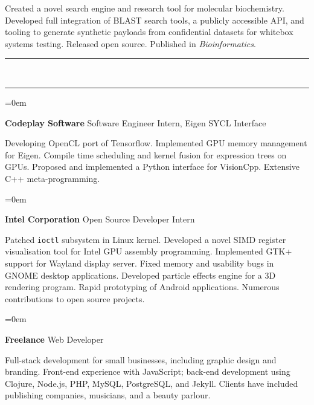 \documentclass[a4paper,11pt,hidelinks]{scrartcl}
\newcommand{\MarginText}[1]{\marginpar{\raggedleft\itshape\normalsize#1}}
\newcommand{\Title}[1]{\noindent\rule{15cm}{0.4pt}\vspace{-.45em}\\
\noindent\spacedlowsmallcaps{\color{titlecolour}{#1}}

\vspace{-.85em}\noindent\rule{15cm}{0.4pt}\vspace{.2em}}
\newcommand{\Description}[1]{\hangindent=0em\hangafter=0%
\noindent\normalsize{#1}\vspace{1em}}
\newcommand{\ShortJob}[3]{\Description{\MarginText{#1}\textbf{#2},
  \textit{#3}}}
\newcommand{\Job}[4]{\Description{\MarginText{#1}\textbf{#2},
  \textit{#3}\newline\vspace{-.8em}

  \noindent
  #4}}
\begin{document}
\begin{cv}
{  \noindent %
  Created a novel search engine and research tool for molecular biochemistry. Developed full integration of BLAST search tools, a publicly accessible API, and tooling to generate synthetic payloads from confidential datasets for whitebox systems testing. Released open source. Published in \textit{Bioinformatics}.%
}


\Title{Professional Experience}

\Description{\MarginText{2016}\textbf{Codeplay Software}
  \newline Software Engineer Intern, Eigen SYCL Interface
  \newline\vspace{-.8em}

  \noindent %
  Developing OpenCL port of Tensorflow. Implemented GPU memory management for Eigen. Compile time scheduling and kernel fusion for expression trees on GPUs. Proposed and implemented a Python interface for VisionCpp. Extensive C++ meta-programming.%
}

\Description{\MarginText{2012--2013}\textbf{Intel Corporation}
  \newline Open Source Developer Intern
  \newline\vspace{-.8em}

  \noindent %
  Patched \texttt{ioctl} subsystem in Linux kernel. Developed a novel SIMD register visualisation tool for Intel GPU assembly programming. Implemented GTK+ support for Wayland display server. Fixed memory and usability bugs in GNOME desktop applications. Developed particle effects engine for a 3D rendering program. Rapid prototyping of Android applications. Numerous contributions to open source projects.%
}

\Description{\MarginText{2010--2014}\textbf{Freelance}
  \newline Web Developer
  \newline\vspace{-.8em}

  \noindent %
  Full-stack development for small businesses, including graphic design and branding. Front-end experience with JavaScript; back-end development using Clojure, Node.js, PHP, MySQL, PostgreSQL, and Jekyll. Clients have included publishing companies, musicians, and a beauty parlour.%

}


\end{cv}
\end{document}
